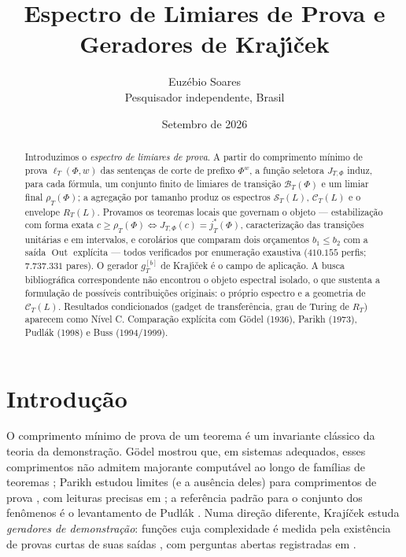 \documentclass[11pt,a4paper]{article}
\title{Espectro de Limiares de Prova e Geradores de Kraj\'{\i}\v{c}ek}
\author{Euz\'{e}bio Soares\\Pesquisador independente, Brasil}
\date{Setembro de 2026}
\theoremstyle{definition}
\theoremstyle{remark}
\newcommand{\Out}{\operatorname{Out}}
\begin{document}
\maketitle

\begin{abstract}
Introduzimos o \emph{espectro de limiares de prova}. A partir do comprimento mínimo
de prova $\ell_T(\Phi,w)$ das senten\c{c}as de corte de prefixo $\Phi^{w}$, a função
seletora $J_{T,\Phi}$ induz, para cada f\'{o}rmula, um conjunto finito de limiares de
transi\c{c}\~{a}o $\mathcal{B}_T(\Phi)$ e um limiar final $\rho_T(\Phi)$; a
agrega\c{c}\~{a}o por tamanho produz os espectros $\mathcal{S}_T(L)$,
$\mathcal{C}_T(L)$ e o envelope $R_T(L)$. Provamos os teoremas locais que governam o
objeto — estabiliza\c{c}\~{a}o com forma exata $c \geq \rho_T(\Phi) \iff
J_{T,\Phi}(c)=j^{*}_{T}(\Phi)$, caracteriza\c{c}\~{a}o das transi\c{c}\~{o}es
unitárias e em intervalos, e corol\'{a}rios que comparam dois or\c{c}amentos $b_1
\leq b_2$ com a sa\'{i}da $\Out$ expl\'{i}cita — todos verificados por enumera\c{c}\~{a}o
exaustiva ($410.155$ perfis; $7.737.331$ pares). O gerador $g_T^{[b]}$ de
Kraj\'{\i}\v{c}ek é o campo de aplicação. A busca bibliográfica correspondente
não encontrou o objeto espectral isolado, o que sustenta a formulação de possíveis
contribuições originais: o próprio espectro e a geometria de $\mathcal{C}_T(L)$.
Resultados condicionados (gadget de transferência, grau de Turing de $R_T$) aparecem
como Nível C. Comparação explícita com Gödel (1936), Parikh (1973), Pudlák (1998)
e Buss (1994/1999).
\end{abstract}

\section{Introdu\c{c}\~{a}o}

O comprimento mínimo de prova de um teorema é um invariante clássico da teoria da
demonstração. Gödel mostrou que, em sistemas adequados, esses comprimentos não
admitem majorante computável ao longo de famílias de teoremas
\cite{Godel1936}; Parikh estudou limites (e a ausência deles) para comprimentos de
prova \cite{Parikh1973}, com leituras precisas em \cite{Buss1994,Buss1999}; a
referência padrão para o conjunto dos fenômenos é o levantamento de Pudlák
\cite{Pudlak1998}. Numa direção diferente, Krajíček estuda \emph{geradores de
demonstração}: funções cuja complexidade é medida pela existência de provas curtas
de suas saídas \cite{Krajicek2025,Krajicek2025generators,Krajicek2024strong}, com
perguntas abertas registradas em \cite{Krajicek2023ECCC}.
\end{document}
